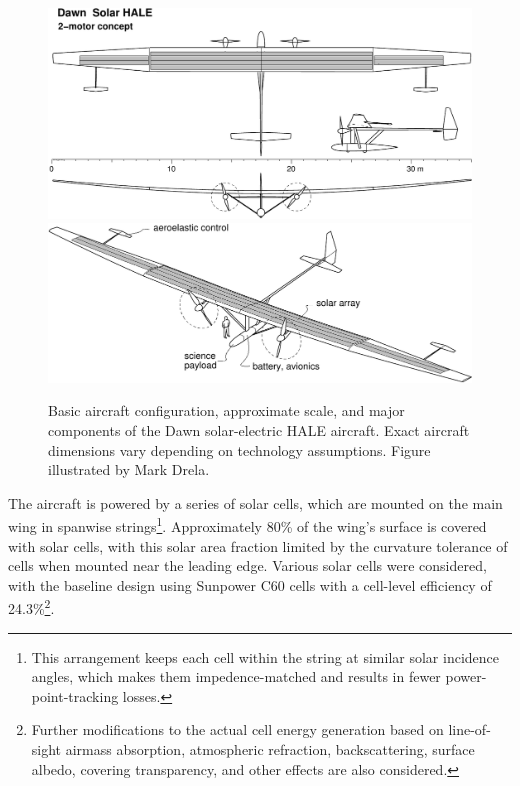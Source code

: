 \begin{figure}[H]
    \centering
    \includegraphics[width=\textwidth]{../figures/dawn1_3view.pdf}
    \includegraphics[width=\textwidth]{../figures/dawn1b.pdf}
    \caption{Basic aircraft configuration, approximate scale, and major components of the Dawn solar-electric HALE aircraft. Exact aircraft dimensions vary depending on technology assumptions. Figure illustrated by Mark Drela.}
    \label{fig:dawn_overview}
\end{figure}


The aircraft is powered by a series of solar cells, which are mounted on the main wing in spanwise strings\footnote{This arrangement keeps each cell within the string at similar solar incidence angles, which makes them impedence-matched and results in fewer power-point-tracking losses.}. Approximately 80\% of the wing's surface is covered with solar cells, with this solar area fraction limited by the curvature tolerance of cells when mounted near the leading edge. Various solar cells were considered, with the baseline design using Sunpower C60 cells with a cell-level efficiency of 24.3\%\footnote{Further modifications to the actual cell energy generation based on line-of-sight airmass absorption, atmospheric refraction, backscattering, surface albedo, covering transparency, and other effects are also considered.}.

